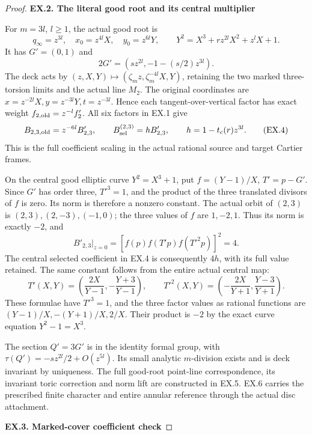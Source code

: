 \begin{proof}
\par

\medskip\noindent\textbf{EX.2. The literal good root and its central multiplier}

\par\nobreak

For \(m=3l\), \(l\ge1\), the actual good root is
\[
 q_\infty=z^{3l},\quad x_0=z^{4l}X,\quad y_0=z^{6l}Y,
 \qquad Y^2=X^3+r z^{2l}X^2+z^lX+1.
 \tag{EX.3}
\]
It has \(G'=(0,1)\) and
\[
 2G'=(s z^{2l},-1-(s/2)z^{3l}).
\]
The deck acts by \((z,X,Y)\mapsto
(\zeta_m z,\zeta_m^{-4l}X,Y)\), retaining the two marked
three-torsion limits and the actual line \(M_2\).
The original coordinates are \(x=z^{-2l}X,y=z^{-3l}Y,t=z^{-3l}\).
Hence each tangent-over-vertical factor has exact weight
\(f_{2,\rm old}=z^{-l}f'_2\). All six factors in EX.1 give
\[
 B_{2,3,\rm old}=z^{-6l}B'_{2,3},\qquad
 B^{(2,3)}_{\rm sel}=h B'_{2,3},\qquad
 h=1-t_c(r)z^{3l}.
 \tag{EX.4}
\]
This is the full coefficient scaling in the actual rational
source and target Cartier frames.

On the central good elliptic curve \(Y^2=X^3+1\), put
\(f=(Y-1)/X\), \(T'=p-G'\). Since \(G'\) has order three,
\(T'^3=1\), and the product of the three translated divisors
of \(f\) is zero. Its norm is therefore a nonzero constant.
The actual orbit of \((2,3)\) is
\((2,3),(2,-3),(-1,0)\); the three values of \(f\) are
\(1,-2,1\). Thus its norm is exactly \(-2\), and
\[
 B'_{2,3}|_{z=0}
   =[f(p)f(T'p)f(T'^2p)]^2=4.
 \tag{EX.5}
\]
The central selected coefficient in EX.4 is consequently \(4h\),
with its full value retained.
The same constant follows from the entire actual central map:
\[
 T'(X,Y)=\left(\frac{2X}{Y-1},-\frac{Y+3}{Y-1}\right),\qquad
 T'^2(X,Y)=\left(-\frac{2X}{Y+1},\frac{Y-3}{Y+1}\right).
\]
These formulae have \(T'^3=1\), and the three factor values as
rational functions are \((Y-1)/X,-(Y+1)/X,2/X\). Their product
is \(-2\) by the exact curve equation \(Y^2-1=X^3\).

The section \(Q'=3G'\) is in the identity formal group, with
\(\tau(Q')=-s z^{2l}/2+O(z^{5l})\). Its small analytic
\(m\)-division exists and is deck invariant by uniqueness.
The full good-root point-line correspondence, its invariant toric
correction and norm lift are constructed in EX.5. EX.6 carries
the prescribed finite character and entire annular reference
through the actual disc attachment.

\par

\medskip\noindent\textbf{EX.3. Marked-cover coefficient check}


\end{proof}
